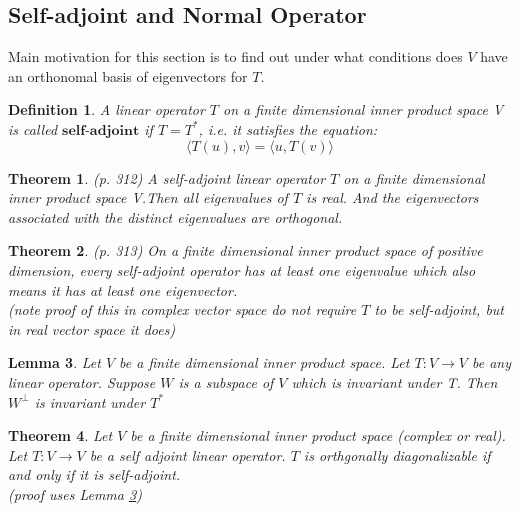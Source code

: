 \documentclass{article}
\newcommand{\innerproduct}[1]{\langle#1\rangle}
\newtheorem{theorem}{Theorem}[section]
\newtheorem{definition}{Definition}[section]
\newtheorem{lemma}[theorem]{Lemma}
\numberwithin{theorem}{subsection} %
\numberwithin{definition}{subsection} %
\numberwithin{proposition}{subsection} %
\begin{document}
\subsection{Self-adjoint and Normal Operator}
Main motivation for this section is to find out under what conditions does $V$ have an
orthonomal basis of eigenvectors for $T$.

\begin{definition}
    A linear operator $T$ on a finite dimensional inner product space V is called
    $\textbf{self-adjoint}$ if $T=T^*$, i.e. it satisfies the equation:
    \begin{equation*}
        \innerproduct{T(u),v} = \innerproduct{u,T(v)}
    \end{equation*}
\end{definition}

\begin{theorem}\label{selfadjointrealandorthogonal}
    (p. 312)
    A self-adjoint linear operator $T$ on a finite dimensional inner product space V.Then
    all eigenvalues of $T$ is real. And the eigenvectors associated with the distinct
    eigenvalues are orthogonal.
\end{theorem}

\begin{theorem}
    (p. 313)
    On a finite dimensional inner product space of positive dimension, every self-adjoint
    operator has at least one eigenvalue which also means it has at least one eigenvector.\\

    (note proof of this in complex vector space do not require $T$ to be self-adjoint, but in
    real vector space it does)
\end{theorem}

\begin{lemma}\label{lem1}
    Let $V$ be a finite dimensional inner product space. Let $T:V
    \rightarrow V$ be any linear operator. Suppose $W$ is a subspace of $V$ which is
    invariant under T. Then $W^\perp$ is invariant under $T^*$
\end{lemma}

\begin{theorem}\label{orthgonallydiagonalizable}
    Let $V$ be a finite dimensional inner product space (complex or real). Let $T:V
    \rightarrow V$ be a self adjoint linear operator. $T$ is orthgonally diagonalizable if
    and only if it is self-adjoint. \\
    (proof uses Lemma \ref{lem1})
\end{theorem}
\end{document}
